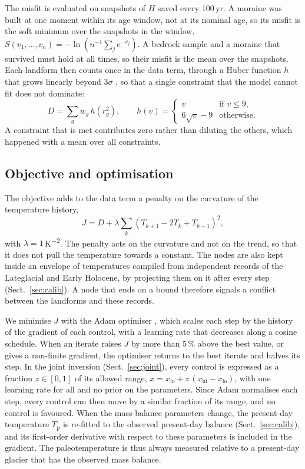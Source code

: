 \documentclass[tc, manuscript]{copernicus}
\begin{document}
The misfit is evaluated on snapshots of $H$ saved every 100\,yr. A moraine was built at one moment within its age window, not at its nominal age, so its misfit is the soft minimum over the snapshots in the window, $S(v_1,\dots,v_n)=-\ln\left(n^{-1}\sum_j \mathrm{e}^{-v_j}\right)$. A bedrock sample and a moraine that survived must hold at all times, so their misfit is the mean over the snapshots. Each landform then counts once in the data term, through a Huber function $h$ that grows linearly beyond $3\sigma$ \citep{huber1964}, so that a single constraint that the model cannot fit does not dominate:
\begin{equation}
D = \sum_g w_g\,h(r_g^2),\qquad h(v)=\begin{cases} v & \text{if } v\le 9,\\ 6\sqrt{v}-9 & \text{otherwise}.\end{cases}
\label{eq:data}
\end{equation}
A constraint that is met contributes zero rather than diluting the others, which happened with a mean over all constraints.


\subsection{Objective and optimisation}
\label{sec:objective}

The objective adds to the data term a penalty on the curvature of the temperature history,
\begin{equation}
J = D + \lambda\sum_k\left(T_{k+1}-2T_k+T_{k-1}\right)^2,
\label{eq:objective}
\end{equation}
with $\lambda=1$\,\unit{K^{-2}}. The penalty acts on the curvature and not on the trend, so that it does not pull the temperature towards a constant. The nodes are also kept inside an envelope of temperatures compiled from independent records of the Lateglacial and Early Holocene, by projecting them on it after every step (Sect.~\ref{sec:calib}). A node that ends on a bound therefore signals a conflict between the landforms and these records.

We minimise $J$ with the Adam optimiser \citep{kingma2015}, which scales each step by the history of the gradient of each control, with a learning rate that decreases along a cosine schedule. When an iterate raises $J$ by more than 5\,\% above the best value, or gives a non-finite gradient, the optimiser returns to the best iterate and halves its step. In the joint inversion (Sect.~\ref{sec:joint}), every control is expressed as a fraction $z\in[0,1]$ of its allowed range, $x=x_\mathrm{lo}+z\,(x_\mathrm{hi}-x_\mathrm{lo})$, with one learning rate for all and no prior on the parameters. Since Adam normalises each step, every control can then move by a similar fraction of its range, and no control is favoured. When the mass-balance parameters change, the present-day temperature $T_\mathrm{p}$ is re-fitted to the observed present-day balance (Sect.~\ref{sec:calib}), and its first-order derivative with respect to these parameters is included in the gradient. The paleotemperature is thus always measured relative to a present-day glacier that has the observed mass balance.
\end{document}
